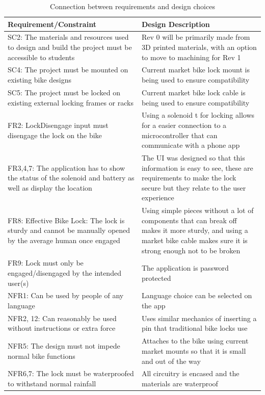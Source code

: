 \documentclass[12pt, titlepage]{article}
\begin{document}
\begin{table}[hp]
\caption{\label{Connection between requirements and design choices} Connection between requirements and design choices}
\begin{tabular}{| p{} | p{} | }
 \hline
 Requirement/Constraint & Design Description\\ 
 \hline
 SC2:  The materials and resources used to design and build the project must be accessible to students& Rev 0 will be primarily made from 3D printed materials, with an option to move to machining for Rev 1\\
 \hline
 SC4:  The project must be mounted on existing bike designs & Current market bike lock mount is being used to ensure compatibility\\
 \hline
 SC5:  The project must be locked on existing external locking frames or racks &Current market bike lock cable is being used to ensure compatibility\\
 \hline
FR2: LockDisengage input must disengage the lock on the bike & Using a solenoid t for locking allows for a easier connection to a microcontroller that can communicate with a phone app\\
 \hline
FR3,4,7: The application has to show the status of the solenoid and battery as well as display the location&The UI was designed so that this information is easy to see, these are requirements to make the lock secure but they relate to the user experience\\
 \hline
FR8: Effective Bike Lock: The lock is sturdy and cannot be manually opened by the average human once engaged& Using simple pieces without a lot of components that can break off makes it more sturdy, and using a market bike cable makes sure it is strong enough not to be broken\\
 \hline
FR9: Lock must only be engaged/disengaged by the intended user(s)& The application is password protected\\
 \hline
NFR1: Can be used by people of any language&Language choice can be selected on the app\\
 \hline
NFR2, 12: Can reasonably be used without instructions or extra force& Uses similar mechanics of inserting a pin that traditional bike locks use\\
 \hline
NFR5: The design must not impede normal bike functions& Attaches to the bike using current market mounts so that it is small and out of the way\\
 \hline
NFR6,7: The lock must be waterproofed to withstand normal rainfall & All circuitry is encased and the materials are waterproof\\

\end{tabular}
\end{table}
\end{document}
